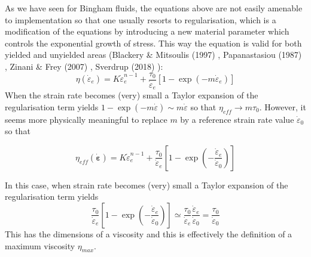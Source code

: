 As we have seen for Bingham fluids, the equations above are not easily amenable to implementation so that 
one usually resorts to regularisation, which is a modification of the 
equations by introducing a new material parameter which controls the exponential 
growth of stress. This way the equation is valid for both yielded 
and unyielded areas (Blackery \& Mitsoulis (1997) \cite{blmi97},
Papanastasiou (1987) \cite{papa87}, Zinani \& Frey (2007) \cite{zifr07}, 
Sverdrup \etal (2018) \cite{svna18}):
\begin{equation}
\eta(\dot{\varepsilon}_e) 
= K \dot{\varepsilon}_e^{n-1} + \frac{\tau_0}{\dot{\varepsilon}_e} [1 - \exp(-m \dot{\varepsilon}_e)] 
\end{equation}
When the strain rate becomes (very) small a Taylor expansion of the regularisation 
term yields $1- \exp(-m \dot{\varepsilon}) \sim m \dot{\varepsilon} $ so that 
$\eta_{eff} \rightarrow m \tau_0$.
However, it seems more physically meaningful to replace $m$ by a reference strain 
rate value $\dot{\varepsilon}_0$ so that 
\begin{mdframed}[backgroundcolor=blue!5]
\begin{equation}
\eta_{eff}(\dot{\bm \varepsilon}) 
= K \dot{\varepsilon}_e^{n-1} + \frac{\tau_0}{\dot{\varepsilon}_e} 
\left[1 - \exp\left(-\frac{\dot{\varepsilon}_e}{\dot{\varepsilon}_0} \right) \right]
\end{equation}
\end{mdframed}
In this case, when strain rate becomes (very) small a Taylor expansion of the regularisation
term yields
\begin{equation}
\frac{\tau_0}{\dot{\varepsilon}_e} \left[1 - 
\exp\left(-\frac{\dot{\varepsilon}_e}{\dot{\varepsilon}_0} \right) \right]
\simeq 
\frac{\tau_0}{\dot{\varepsilon}_e} \frac{\dot{\varepsilon}_e}{\dot{\varepsilon}_0}
=\frac{\tau_0}{\dot{\varepsilon}_0} 
\end{equation}
This has the dimensions of a viscosity and this is effectively the definition 
of a maximum viscosity $\eta_{max}$.

